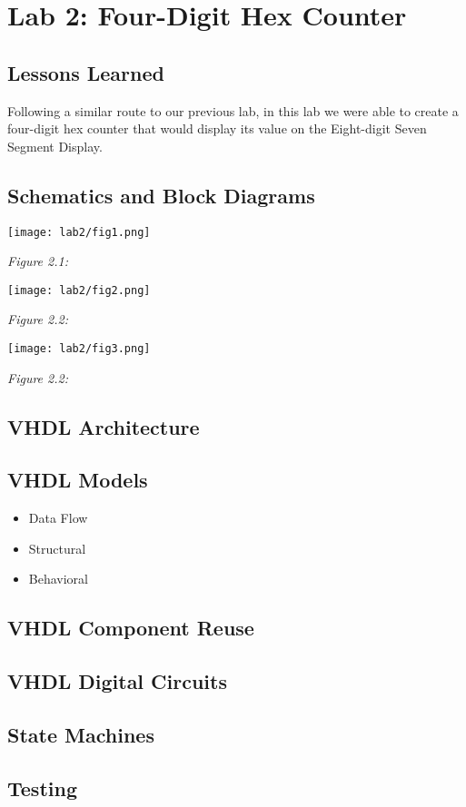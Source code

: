 \chapter{Lab 2: Four-Digit Hex Counter \\
\label{Introduction}}


\section{Lessons Learned
\label{Section::Lessons Learned}}
Following a similar route to our previous lab, in this lab we were able to create a four-digit hex counter that would display its value on the Eight-digit Seven Segment Display. 

 \section{Schematics and Block Diagrams}
  \begin{center}
    \texttt{[image: lab2/fig1.png]}
    
    \emph{Figure 2.1: }

    \texttt{[image: lab2/fig2.png]}
    
    \emph{Figure 2.2: }

    \texttt{[image: lab2/fig3.png]}
    
    \emph{Figure 2.2: }
\end{center}

 \section{VHDL Architecture}
 \section{VHDL Models}
 \begin{itemize}
     \item Data Flow
     \item Structural
     \item Behavioral
\end{itemize}
 \section{VHDL Component Reuse}
 \section{VHDL Digital Circuits}
 \section{State Machines}
 \section{Testing}
